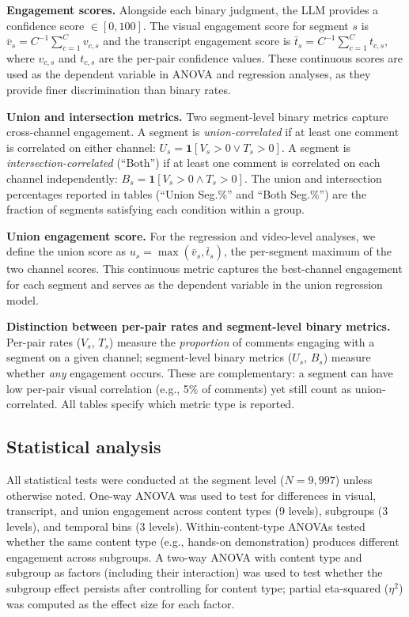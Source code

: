 \documentclass[fleqn,10pt]{wlscirep}
\begin{document}
\textbf{Engagement scores.} Alongside each binary judgment, the LLM provides a confidence score $\in [0, 100]$. The visual engagement score for segment $s$ is $\bar{v}_s = C^{-1}\sum_{c=1}^{C} v_{c,s}$ and the transcript engagement score is $\bar{t}_s = C^{-1}\sum_{c=1}^{C} t_{c,s}$, where $v_{c,s}$ and $t_{c,s}$ are the per-pair confidence values. These continuous scores are used as the dependent variable in ANOVA and regression analyses, as they provide finer discrimination than binary rates.

\textbf{Union and intersection metrics.} Two segment-level binary metrics capture cross-channel engagement. A segment is \emph{union-correlated} if at least one comment is correlated on either channel: $U_s = \mathbf{1}[V_s > 0 \lor T_s > 0]$. A segment is \emph{intersection-correlated} (``Both'') if at least one comment is correlated on each channel independently: $B_s = \mathbf{1}[V_s > 0 \land T_s > 0]$. The union and intersection percentages reported in tables (``Union Seg.\%'' and ``Both Seg.\%'') are the fraction of segments satisfying each condition within a group.

\textbf{Union engagement score.} For the regression and video-level analyses, we define the union score as $u_s = \max(\bar{v}_s, \bar{t}_s)$, the per-segment maximum of the two channel scores. This continuous metric captures the best-channel engagement for each segment and serves as the dependent variable in the union regression model.

\textbf{Distinction between per-pair rates and segment-level binary metrics.} Per-pair rates ($V_s$, $T_s$) measure the \emph{proportion} of comments engaging with a segment on a given channel; segment-level binary metrics ($U_s$, $B_s$) measure whether \emph{any} engagement occurs. These are complementary: a segment can have low per-pair visual correlation (e.g., 5\% of comments) yet still count as union-correlated. All tables specify which metric type is reported.



\subsection*{Statistical analysis}

All statistical tests were conducted at the segment level ($N = 9{,}997$) unless otherwise noted. One-way ANOVA was used to test for differences in visual, transcript, and union engagement across content types (9 levels), subgroups (3 levels), and temporal bins (3 levels). Within-content-type ANOVAs tested whether the same content type (e.g., hands-on demonstration) produces different engagement across subgroups. A two-way ANOVA with content type and subgroup as factors (including their interaction) was used to test whether the subgroup effect persists after controlling for content type; partial eta-squared ($\eta^2$) was computed as the effect size for each factor.
\end{document}
